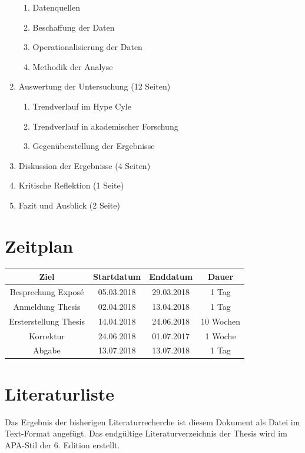 \begin{enumerate}
	\begin{enumerate}
		\item Datenquellen
		\item Beschaffung der Daten
		\item Operationalisierung der Daten
		\item Methodik der Analyse
	\end{enumerate}
	\item Auswertung der Untersuchung (12 Seiten)
	\begin{enumerate}
		\item Trendverlauf im Hype Cyle
		\item Trendverlauf in akademischer Forschung
		\item Gegenüberstellung der Ergebnisse
	\end{enumerate}
	\item Diskussion der Ergebnisse (4 Seiten)
	\item Kritische Reflektion (1 Seite)
	\item Fazit und Ausblick (2 Seite)
\end{enumerate}

\section{Zeitplan}
\begin{tabular}{|c|c|c|c|}
	\hline 
	Ziel & Startdatum & Enddatum & Dauer \\ 
	\hline 
	Besprechung Exposé & 05.03.2018 & 29.03.2018 & 1 Tag \\ 
	\hline 
	Anmeldung Thesis & 02.04.2018 & 13.04.2018 & 1 Tag \\ 
	\hline 
	Ersterstellung Thesis & 14.04.2018 & 24.06.2018 & 10 Wochen \\ 
	\hline 
	Korrektur & 24.06.2018 & 01.07.2017 & 1 Woche \\ 
	\hline 
	Abgabe & 13.07.2018 & 13.07.2018 & 1 Tag \\ 
	\hline 
\end{tabular} 

\section{Literaturliste}
Das Ergebnis der bisherigen Literaturrecherche ist diesem Dokument als Datei im Text-Format angefügt.
Das endgültige Literaturverzeichnis der Thesis wird im APA-Stil der 6. Edition erstellt.